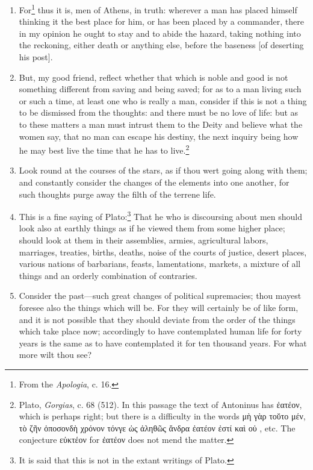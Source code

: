 \begin{enumerate}
\item For\footnote{From the \textit{Apologia}, c. 16.} thus it is, men of Athens, in truth: wherever a man has placed himself thinking it the best place for him, or has been placed by a commander, there in my opinion he ought to stay and to abide the hazard, taking nothing into the reckoning, either death or anything else, before the baseness [{\clarify of deserting his post}].

\item But, my good friend, reflect whether that which is noble and good is not something different from saving and being saved; for as to a man living such or such a time, at least one who is really a man, consider if this is not a thing to be dismissed from the thoughts: and there must be no love of life: but as to these matters a man must intrust them to the Deity and believe what the women say, that no man can escape his destiny, the next inquiry being how he may best live the time that he has to live.\footnote{Plato, \textit{Gorgias}, c. 68 (512). In this passage the text of Antoninus has \textgreek{ἐατέον}, which is perhaps right; but there is a difficulty in the words \textgreek{μὴ γὰρ τοῠτο μέν, τὸ ζῆν ὁποσονδὴ χρόνον τόνγε ὡς ἀληθῶς ἄνδρα ἐατέον ἐστί καὶ οὐ} , etc. The conjecture \textgreek{εὐκτέον} for \textgreek{ἐατέον} does not mend the matter.}

\item Look round at the courses of the stars, as if thou wert going along with them; and constantly consider the changes of the elements into one another, for such thoughts purge away the filth of the terrene life.

\item This is a fine saying of Plato:\footnote{It is said that this is not in the extant writings of Plato.} That he who is discoursing about men should look also at earthly things as if he viewed them from some higher place; should look at them in their assemblies, armies, agricultural labors, marriages, treaties, births, deaths, noise of the courts of justice, desert places, various nations of barbarians, feasts, lamentations, markets, a mixture of all things and an orderly combination of contraries.

\item Consider the past—such great changes of political supremacies; thou mayest foresee also the things which will be. For they will certainly be of like form, and it is not possible that they should deviate from the order of the things which take place now; accordingly to have contemplated human life for forty years is the same as to have contemplated it for ten thousand years. For what more wilt thou see?


\end{enumerate}
